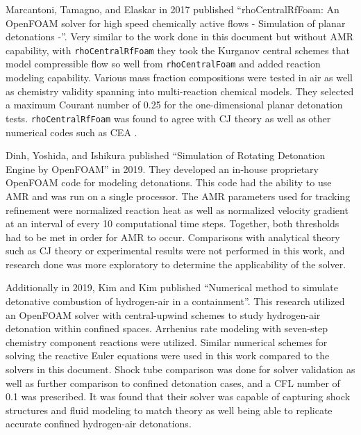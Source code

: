 Marcantoni, Tamagno, and Elaskar in 2017 published ``rhoCentralRfFoam: An OpenFOAM solver for high speed chemically active flows - Simulation of planar detonations -''\cite{marcantoni}. Very similar to the work done in this document but without AMR capability, with \verb|rhoCentralRfFoam| they took the Kurganov central schemes that model compressible flow so well from \verb|rhoCentralFoam| and added reaction modeling capability. Various mass fraction compositions were tested in air as well as chemistry validity spanning into multi-reaction chemical models. They selected a maximum Courant number of 0.25 for the one-dimensional planar detonation tests. \verb|rhoCentralRfFoam| was found to agree with CJ theory as well as other numerical codes such as CEA \cite{CEA}. 

Dinh, Yoshida, and Ishikura published ``Simulation of Rotating Detonation Engine by OpenFOAM''\cite{dinh} in 2019. They developed an in-house proprietary OpenFOAM code for modeling detonations. This code had the ability to use AMR and was run on a single processor. The AMR parameters used for tracking refinement were normalized reaction heat as well as normalized velocity gradient at an interval of every 10 computational time steps. Together, both thresholds had to be met in order for AMR to occur. Comparisons with analytical theory such as CJ theory or experimental results were not performed in this work, and research done was more exploratory to determine the applicability of the solver. 

Additionally in 2019, Kim and Kim published ``Numerical method to simulate detonative combustion of hydrogen-air in a containment''\cite{kim}. This research utilized an OpenFOAM solver with central-upwind schemes to study hydrogen-air detonation within confined spaces. Arrhenius rate modeling with seven-step chemistry component reactions were utilized. Similar numerical schemes for solving the reactive Euler equations were used in this work compared to the solvers in this document. Shock tube comparison was done for solver validation as well as further comparison to confined detonation cases, and a CFL number of 0.1 was prescribed. It was found that their solver was capable of capturing shock structures and fluid modeling to match theory as well being able to replicate accurate confined hydrogen-air detonations. 




